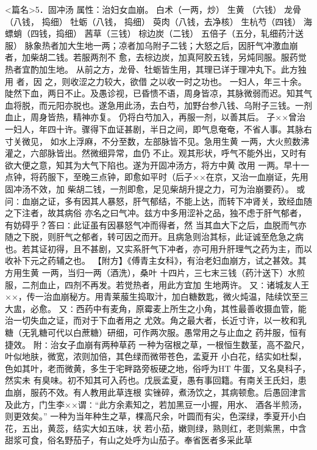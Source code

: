 \documentclass[a4paper,12pt,UTF8,twoside]{ctexbook}
\begin{document}
<篇名>5．固冲汤
属性：治妇女血崩。 
白术（一两，炒） 生黄 （六钱） 龙骨（八钱， 捣细） 牡蛎（八钱， 捣细） 萸肉（八钱，去净核） 
生杭芍（四钱） 海螵蛸（四钱，捣细） 茜草（三钱） 棕边炭（二钱） 五倍子（五分，轧细药汁送服） 
脉象热者加大生地一两；凉者加乌附子二钱；大怒之后，因肝气冲激血崩者，加柴胡二钱。若服两剂不 
愈，去棕边炭，加真阿胶五钱，另炖同服。服药觉热者宜酌加生地。 
从前之方，龙骨、牡蛎皆生用，其理已详于理冲丸下。此方独用 者，因 之，则收涩之力较大，欲借 
之以收一时之功也。 
一妇人，年三十余。陡然下血，两日不止。及愚诊视，已昏愦不语，周身皆凉，其脉微弱而迟。知其气 
血将脱，而元阳亦脱也。遂急用此汤，去白芍，加野台参八钱、乌附子三钱。一剂血止，周身皆热，精神亦复。 
仍将白芍加入，再服一剂，以善其后。 
子××曾治一妇人，年四十许。骤得下血证甚剧，半日之间，即气息奄奄，不省人事。其脉右寸关微见， 
如水上浮麻，不分至数，左部脉皆不见。急用生黄 一两，大火煎数沸灌之，六部脉皆出。然微细异常，血仍 
不止。观其形状，呼气不能外出，又时有欲大便之意，知其为大气下陷也。遂为开固冲汤方，将方中黄 改用 
一两。早十一点钟，将药服下，至晚三点钟，即愈如平时（后子××在京，又治一血崩证，先用固冲汤不效，加 
柴胡二钱，一剂即愈，足见柴胡升提之力，可为治崩要药）。 
或问∶血崩之证，多有因其人暴怒，肝气郁结，不能上达，而转下冲肾关，致经血随之下注者，故其病俗 
亦名之曰气冲。兹方中多用涩补之品，独不虑于肝气郁者，有妨碍乎？答曰∶此证虽有因暴怒气冲而得者，然 
当其血大下之后，血脱而气亦随之下脱，则肝气之郁者，转可因之而开。且病急则治其标，此证诚至危急之病 
也。若其证初得，且不甚剧，又实系肝气下冲者，亦可用升肝理气之药为主，而以收补下元之药辅之也。 
【附方】《傅青主女科》，有治老妇血崩方，试之甚效。其方用生黄 一两，当归一两（酒洗），桑叶 
十四片，三七末三钱（药汁送下）水煎服，二剂血止，四剂不再发。若觉热者，用此方宜加 
生地两许。 
又∶诸城友人王××，传一治血崩秘方。用青莱菔生捣取汁，加白糖数匙，微火炖温，陆续饮至三大盅，必愈。 
又∶西药中有麦角，原霉麦上所生之小角，其性最善收摄血管，能治一切失血之证，而对于下血者用之 
尤效。角之最大者，长近寸许，以一枚和乳糖（无乳糖可代以白蔗糖）研细，可作两次服。愚常用之与止血之 
药并服，恒有捷效。 
附∶治女子血崩有两种草药 
一种为宿根之草，一根恒生数茎，高不盈尺，叶似地肤，微宽，浓则加倍，其色绿而微带苍色，孟夏开 
小白花，结实如杜梨，色如其叶，老而微黄，多生于宅畔路旁板硬之地，俗呼为HT 牛蛋，又名臭科子，然实未 
有臭味。初不知其可入药也。戊辰孟夏，愚有事回籍。有南关王氏妇，患血崩，服药不效。有人教用此草连根 
实锉碎，煮汤饮之，其病顿愈。后愚回津言及此方，门生李××谓∶“此方余素知之，若加黑豆一小握，用水、 
酒各半煎汤，则更效矣。” 
一种为当年种生之草，棵高尺余，叶圆而有尖，色深绿，季夏开小白花，五出，黄蕊，结实大如五味，状 
若小茄，嫩则绿，熟则红，老则紫黑，中含甜浆可食，俗名野茄子，有山之处呼为山茄子。奉省医者多采此草 
\end{document}
